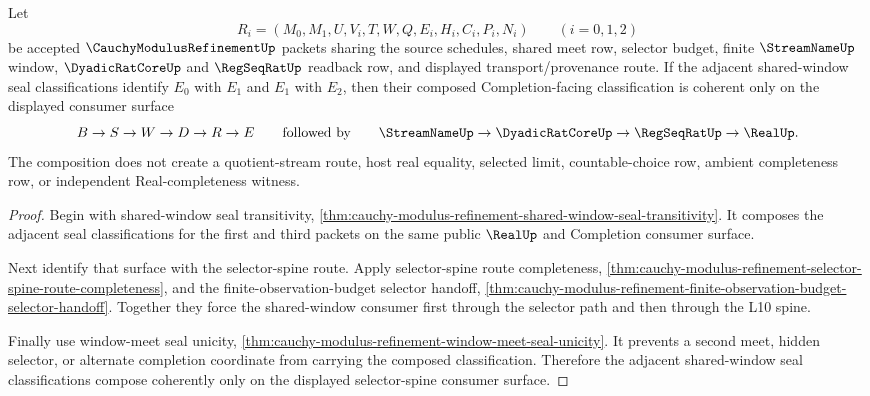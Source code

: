 \begin{theorem}
\label{thm:cauchy-modulus-refinement-shared-window-completion-seal-coherence}
Let
$$
R_i=(M_0,M_1,U,V_i,T,W,Q,E_i,H_i,C_i,P_i,N_i)
\qquad (i=0,1,2)
$$
be accepted $\CauchyModulusRefinementUp$ packets sharing the source schedules,
shared meet row, selector budget, finite $\StreamNameUp$ window,
$\DyadicRatCoreUp$ and $\RegSeqRatUp$ readback row, and displayed
transport/provenance route. If the adjacent shared-window seal classifications
identify $E_0$ with $E_1$ and $E_1$ with $E_2$, then their composed
Completion-facing classification is coherent only on the displayed consumer
surface
$$
B \to S \to W \to D \to R \to E
\qquad\text{followed by}\qquad
\StreamNameUp \to \DyadicRatCoreUp \to \RegSeqRatUp \to \RealUp.
$$
The composition does not create a quotient-stream route, host real equality,
selected limit, countable-choice row, ambient completeness row, or independent
Real-completeness witness.
\end{theorem}
\begin{proof}
Begin with shared-window seal transitivity,
\autoref{thm:cauchy-modulus-refinement-shared-window-seal-transitivity}. It
composes the adjacent seal classifications for the first and third packets on
the same public $\RealUp$ and Completion consumer surface.

Next identify that surface with the selector-spine route. Apply selector-spine
route completeness,
\autoref{thm:cauchy-modulus-refinement-selector-spine-route-completeness}, and
the finite-observation-budget selector handoff,
\autoref{thm:cauchy-modulus-refinement-finite-observation-budget-selector-handoff}.
Together they force the shared-window consumer first through the selector path
and then through the L10 spine.

Finally use window-meet seal unicity,
\autoref{thm:cauchy-modulus-refinement-window-meet-seal-unicity}. It prevents a
second meet, hidden selector, or alternate completion coordinate from carrying
the composed classification. Therefore the adjacent shared-window seal
classifications compose coherently only on the displayed selector-spine
consumer surface.
\end{proof}


